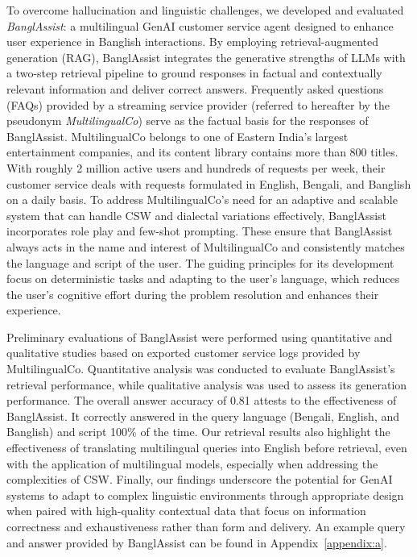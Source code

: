 \documentclass[sigconf]{acmart}
\begin{document}
To overcome hallucination and linguistic challenges, we developed and evaluated \textit{BanglAssist}: a multilingual GenAI customer service agent designed to enhance user experience in Banglish interactions. By employing retrieval-augmented generation (RAG), BanglAssist integrates the generative strengths of LLMs with a two-step retrieval pipeline to ground responses in factual and contextually relevant information and deliver correct answers. Frequently asked questions (FAQs) provided by a streaming service provider (referred to hereafter by the pseudonym \textit{MultilingualCo}) serve as the factual basis for the responses of BanglAssist. MultilingualCo belongs to one of Eastern India's largest entertainment companies, and its content library contains more than 800 titles. With roughly 2 million active users and hundreds of requests per week, their customer service deals with requests formulated in English, Bengali, and Banglish on a daily basis. To address MultilingualCo's need for an adaptive and scalable system that can handle CSW and dialectal variations effectively, BanglAssist incorporates role play and few-shot prompting. These ensure that BanglAssist always acts in the name and interest of MultilingualCo and consistently matches the language and script of the user. The guiding principles for its development focus on deterministic tasks and adapting to the user's language, which reduces the user's cognitive effort during the problem resolution and enhances their experience.

Preliminary evaluations of BanglAssist were performed using quantitative and qualitative studies based on exported customer service logs provided by MultilingualCo. Quantitative analysis was conducted to evaluate BanglAssist's retrieval performance, while qualitative analysis was used to assess its generation performance. The overall answer accuracy of 0.81 attests to the effectiveness of BanglAssist. It correctly answered in the query language (Bengali, English, and Banglish) and script 100\% of the time. Our retrieval results also highlight the effectiveness of translating multilingual queries into English before retrieval, even with the application of multilingual models, especially when addressing the complexities of CSW. Finally, our findings underscore the potential for GenAI systems to adapt to complex linguistic environments through appropriate design when paired with high-quality contextual data that focus on information correctness and exhaustiveness rather than form and delivery. An example query and answer provided by BanglAssist can be found in Appendix~\ref{appendix:a}.
\end{document}
